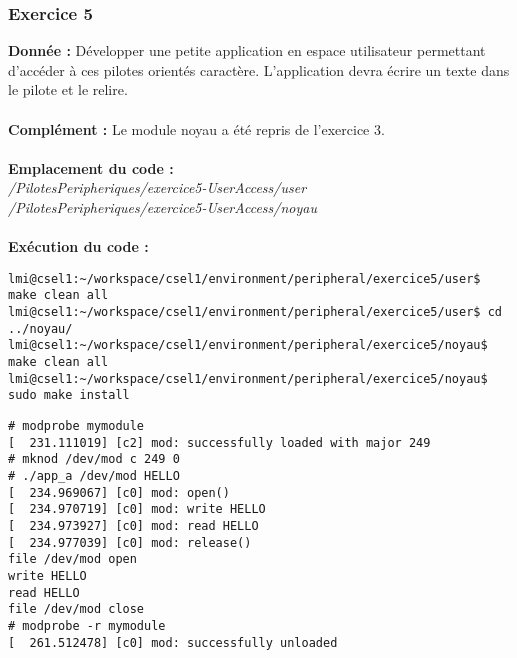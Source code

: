 \subsubsection{Exercice 5}
\textbf{Donnée : } Développer	une	petite	application	en	espace	utilisateur	permettant	d’accéder	à	ces	pilotes	
orientés	caractère.	L’application	devra	écrire	un	texte	dans	le	pilote	et	le	relire.\\\\
\textbf{Complément : } Le module noyau a été repris de l'exercice 3.\\\\
\textbf{Emplacement du code : }\\ \textit{/PilotesPeripheriques/exercice5-UserAccess/user}\\
\textit{/PilotesPeripheriques/exercice5-UserAccess/noyau}\\\\
\textbf{Exécution du code : } \\
\begin{lstlisting}
lmi@csel1:~/workspace/csel1/environment/peripheral/exercice5/user$ make clean all
lmi@csel1:~/workspace/csel1/environment/peripheral/exercice5/user$ cd ../noyau/
lmi@csel1:~/workspace/csel1/environment/peripheral/exercice5/noyau$ make clean all
lmi@csel1:~/workspace/csel1/environment/peripheral/exercice5/noyau$ sudo make install
\end{lstlisting}
\begin{lstlisting}
# modprobe mymodule                                                             
[  231.111019] [c2] mod: successfully loaded with major 249    
# mknod /dev/mod c 249 0                  
# ./app_a /dev/mod HELLO                                                        
[  234.969067] [c0] mod: open()                                                 
[  234.970719] [c0] mod: write HELLO                                            
[  234.973927] [c0] mod: read HELLO                                             
[  234.977039] [c0] mod: release()                                              
file /dev/mod open                                                              
write HELLO                                                                     
read HELLO                                                                      
file /dev/mod close                                                             
# modprobe -r mymodule                                                          
[  261.512478] [c0] mod: successfully unloaded
\end{lstlisting}

